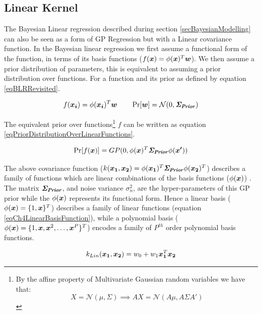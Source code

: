 \subsection{Linear Kernel} \label{subSecCh4LinearKernel}
The Bayesian Linear regression described during section \ref{secBayesianModelling} can also be seen as a form of GP Regression but with a Linear covariance function. In the Bayesian linear regression we first assume a functional form of the function, in terms of its basis functions ($f(\boldsymbol{x}) = \phi(\boldsymbol{x})^{T}\boldsymbol{w}$). We then assume a prior distribution of parameters, this is equivalent to assuming a prior distribution over functions. For a function and its prior as defined by equation \ref{eqBLRRevisited}.

\begin{equation}\label{eqBLRRevisited}
    f(\boldsymbol{x_{i}}) = \phi(\boldsymbol{x_{i}})^{T}\boldsymbol{w}
\quad \quad \Pr[\boldsymbol{w}] = \mathcal{N}(0, \bm{\mathit{\Sigma_{Prior}}} ) 
\end{equation}

The equivalent prior over functions\footnote{By the affine property of Multivariate Gaussian random variables we have that: $$X = \mathcal{N}(\mu, \Sigma) \implies AX = \mathcal{N}(A\mu, A\Sigma A')$$} $f$ can be written as equation \ref{eqPriorDistributionOverLinearFunctions}.

\begin{equation}\label{eqPriorDistributionOverLinearFunctions}
    \Pr[f(\boldsymbol{x})] = GP(0, \phi(\boldsymbol{x})^{T} \bm{\mathit{\Sigma_{Prior}}} \phi(\boldsymbol{x'}))
\end{equation}

The above covariance function ($k(\boldsymbol{x_{1}}, \boldsymbol{x_{2}}) = \phi(\boldsymbol{x_1})^{T} \bm{\mathit{\Sigma_{Prior}}} \phi(\boldsymbol{x_2})^{T}$) describes a family of functions which are linear combinations of the basis functions ($\phi(\boldsymbol{x})$) \cite{bishop2006pattern}. The matrix $\bm{\mathit{\Sigma_{Prior}}}$, and noise variance $\sigma_{n}^2$, are the hyper-parameters of this GP prior while the $\phi(\boldsymbol{x})$ represents its functional form. Hence a linear basis ($\phi(\boldsymbol{x}) = \{1, \boldsymbol{x}\}^{T}$) describes a family of linear functions (equation \ref{eqCh4LinearBasisFunction}), while a polynomial basis ($\phi(\boldsymbol{x}) = \{1, \boldsymbol{x}, \boldsymbol{x}^2, \ldots, \boldsymbol{x}^P\}^{T}$) encodes a family of $P^{th}$ order polynomial basis functions.

\begin{equation}\label{eqCh4LinearBasisFunction}
k_{Lin}(\boldsymbol{x_{1}}, \boldsymbol{x_{2}}) = w_{0} + w_{1} \boldsymbol{x_{1}}^T \boldsymbol{x_{2}}
\end{equation}

